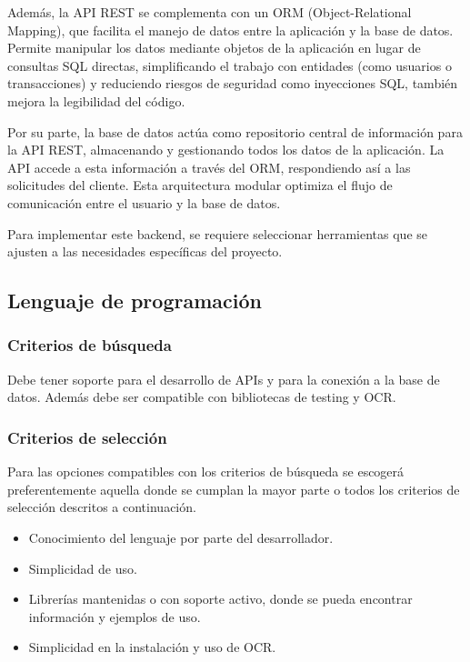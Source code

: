 Además, la API REST se complementa con un ORM (Object-Relational Mapping), que facilita el manejo de datos entre la aplicación y la base de datos. Permite manipular los datos mediante objetos de la aplicación en lugar de consultas SQL directas, simplificando el trabajo con entidades (como usuarios o transacciones) y reduciendo riesgos de seguridad como inyecciones SQL, también mejora la legibilidad del código.

Por su parte, la base de datos actúa como repositorio central de información para la API REST, almacenando y gestionando todos los datos de la aplicación. La API accede a esta información a través del ORM, respondiendo así a las solicitudes del cliente. Esta arquitectura modular optimiza el flujo de comunicación entre el usuario y la base de datos\cite{marquez2022backend}.

Para implementar este backend, se requiere seleccionar herramientas que se ajusten a las necesidades específicas del proyecto.

\subsection{Lenguaje de programación}
\subsubsection{Criterios de búsqueda}
Debe tener soporte para el desarrollo de APIs y para la conexión a la base de datos. Además debe ser compatible con bibliotecas de testing y OCR.

\subsubsection{Criterios de selección}
Para las opciones compatibles con los criterios de búsqueda se escogerá preferentemente aquella donde se cumplan la mayor parte o todos los criterios de selección descritos a continuación.

\begin{itemize}
    \item Conocimiento del lenguaje por parte del desarrollador.
    \item Simplicidad de uso.
    \item Librerías mantenidas o con soporte activo, donde se pueda encontrar información y ejemplos de uso.
    \item Simplicidad en la instalación y uso de OCR.
\end{itemize}

